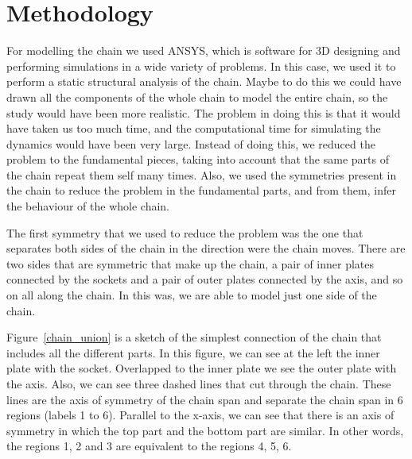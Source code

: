 \documentclass[a4paper 12pt]{article}
\begin{document}
\section{Methodology}

For modelling the chain we used ANSYS, which is software for 3D designing and performing simulations in a wide variety of problems. In this case, we used it to perform a static structural analysis of the chain. Maybe to do this we could have drawn all the components of the whole chain to model the entire chain, so the study would have been more realistic. The problem in doing this is that it would have taken us too much time, and the computational time for simulating the dynamics would have been very large. Instead of doing this, we reduced the problem to the fundamental pieces, taking into account that the same parts of the chain repeat them self many times. Also, we used the symmetries present in the chain to reduce the problem in the fundamental parts, and from them, infer the behaviour of the whole chain.

The first symmetry that we used to reduce the problem was the one that separates both sides of the chain in the direction were the chain moves. There are two sides that are symmetric that make up the chain, a pair of inner plates connected by the sockets and a pair of outer plates connected by the axis, and so on all along the chain. In this was, we are able to model just one side of the chain.

Figure~\ref{chain_union} is a sketch of the simplest connection of the chain that includes all the different parts. In this figure, we can see at the left the inner plate with the socket. Overlapped to the inner plate we see the outer plate with the axis. Also, we can see three dashed lines that cut through the chain. These lines are the axis of symmetry of the chain span and separate the chain span in 6 regions (labels 1 to 6). Parallel to the x-axis, we can see that there is an axis of symmetry in which the top part and the bottom part are similar. In other words, the regions 1, 2 and 3 are equivalent to the regions 4, 5, 6.
\end{document}

